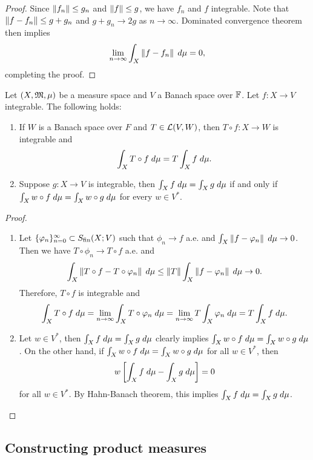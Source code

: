 \documentclass[a4paper]{article}
\begin{document}
\begin{proof}
Since $\left\lVert f_n\right\rVert \leq g_n$ and $\left\lVert f\right\rVert \leq g$, 
we have $f_n$ and $f$ integrable. Note that 
$\left\lVert f - f_n\right\rVert \leq g + g_n$ and $g + g_n \to 2g$ 
as $n \to \infty$. Dominated convergence theorem then implies 
\[
\lim_{n \to \infty} \int_X \left\lVert f - f_n\right\rVert \; d \mu = 0,
\]
completing the proof.
\end{proof}

\begin{prop}
Let $(X, \mathfrak{M}, \mu)$ be a measure space and $V$ a Banach 
space over $\mathbb{F}$. 
Let $f : X \to V$ integrable. The following holds: 
\begin{enumerate}
\item If $W$ is a Banach space over $F$ and $T \in \mathcal{L}(V, W)$,
then $T \circ f: X \to W$ is integrable and 
\[
\int_X T \circ f \; d \mu = T \int_X f \; d \mu.
\]

\item Suppose $g : X \to V$ is integrable, then 
$\int_X f \; d \mu = \int_X g \; d \mu$ if and only if 
$\int_X w \circ f \; d \mu = \int_X w \circ g \; d \mu$ 
for every $w \in V^*$.
\end{enumerate}
\end{prop}

\begin{proof}
\begin{enumerate}
\item Let $\{ \varphi_n \}_{n=0}^\infty \subset S_{\text{fin}}(X ; V)$ such that 
$\phi_n \to f$ a.e. and $\int_X \left\lVert f - \varphi_n\right\rVert \; d \mu \to 0$.
Then we have $T \circ \phi_n \to T \circ f$ a.e. and 
\[
\int_X \left\lVert T \circ f - T \circ \varphi_n\right\rVert \; d \mu
\leq \left\lVert T\right\rVert \int_X \left\lVert f - \varphi_n\right\rVert \; d \mu \to 0.
\]
Therefore, $T \circ f$ is integrable and 
\[
\int_X T \circ f \; d \mu = \lim_{n \to \infty}
\int_X T \circ \varphi_n \; d \mu
= \lim_{n \to \infty} T \int_X \varphi_n \; d \mu
= T \int_X f \; d \mu.
\]

\item Let $w \in V^*$, then $\int_X f \; d \mu = \int_X g \; d \mu$
clearly implies $\int_X w \circ f \; d \mu = \int_X w \circ g 
\; d \mu$. On the other hand, if $\int_X w \circ f \; d \mu = \int_X 
w \circ g \; d \mu$ for all $w \in V^*$, then 
\[
w \left[ \int_X f \; d \mu - \int_X g \; d \mu \right] = 0
\]
for all $w \in V^*$. By Hahn-Banach theorem, 
this implies $\int_X f \; d \mu = \int_X g \; d \mu$.
\end{enumerate}
\end{proof}

\subsection{Constructing product measures}
\end{document}
